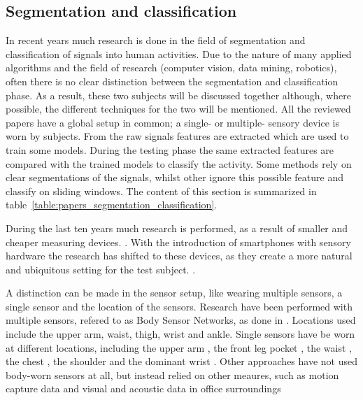 
\subsection{Segmentation and classification}\label{sec:lit_review_segmentation}
In recent years much research is done in the field of segmentation and classification of signals into human activities.
Due to the nature of many applied algorithms and the field of research (computer vision, data mining, robotics), often there is no clear distinction between the segmentation and classification phase.
As a result, these two subjects will be discussed together although, where possible, the different techniques for the two will be mentioned.
All the reviewed papers have a global setup in common; a single- or multiple- sensory device is worn by subjects.
From the raw signals features are extracted which are used to train some models.
During the testing phase the same extracted features are compared with the trained models to classify the activity.
Some methods rely on clear segmentations of the signals, whilst other ignore this possible feature and classify on sliding windows.
The content of this section is summarized in table~\ref{table:papers_segmentation_classification}.

During the last ten years much research is performed, as a result of smaller and cheaper measuring devices. .
With the introduction of smartphones with sensory hardware the research has shifted to these devices, as they create a more natural and ubiquitous setting for the test subject. .

A distinction can be made in the sensor setup, like wearing multiple sensors, a single sensor and the location of the sensors.
Research have been performed with multiple sensors, refered to as Body Sensor Networks, as done in \cite{guenterberg2009automatic, guenterberg2009distributed, bao2004activity, sherril2005using}.
Locations used include the upper arm, waist, thigh, wrist and ankle.
Single sensors have be worn at different locations, including the upper arm \cite{krause2003unsupervised}, the front leg pocket \cite{kwapisz2011activity, duque2012offline, siirtola2012recognizing, he2009activity}, the waist \cite{ravi2005activity, lester2006practical, lee2178physical}, the chest \cite{ahmed2012non, himberg2001time}, the shoulder \cite{lester2005hybrid} and the dominant wrist \cite{yang2008using, long2009single}.
Other approaches have not used body-worn sensors at all, but instead relied on other meaures, such as motion capture data \cite{barbivc2004segmenting, zhou2008aligned} and visual \cite{perdikis2008recognition} and acoustic data in office surroundings \cite{oliver2002layered}


